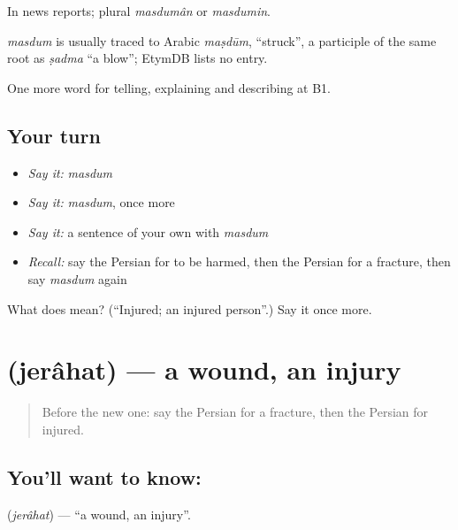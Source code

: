 In news reports; plural \emph{masdumân} or \emph{masdumin}.

\begin{cousinweb}
\emph{masdum} is usually traced to Arabic \emph{maṣdūm}, \textquotedblleft{}struck\textquotedblright{}, a participle of the same root as \emph{ṣadma} \textquotedblleft{}a blow\textquotedblright{}; EtymDB lists no entry.
\end{cousinweb}

\begin{grammarlens}[title={What you've built}]
One more word for telling, explaining and describing at B1.
\end{grammarlens}

\subsection*{Your turn}
\begin{itemize}
\raggedright
  \item \emph{Say it:} \emph{masdum}
  \item \emph{Say it:} \emph{masdum}, once more
  \item \emph{Say it:} a sentence of your own with \emph{masdum}
  \item \emph{Recall:} say the Persian for to be harmed, then the Persian for a fracture, then say \emph{masdum} again
\end{itemize}

\begin{tcolorbox}[breakable,colback=teal!4,colframe=teal!35!black,title={Before you move on}]
What does  mean? (\textquotedblleft{}Injured; an injured person\textquotedblright{}.) Say it once more.
\end{tcolorbox}
\section[\texorpdfstring{\fa{جراحت} (jerâhat)}{جراحت (jerâhat)}]{ (jerâhat) — a wound, an injury}

\label{lesson:FA-C326-jerahat}



\begin{quote}
Before the new one: say the Persian for a fracture, then the Persian for injured.
\end{quote}

\subsection*{You'll want to know: }
\textbf{} (\emph{jerâhat}) — \textquotedblleft{}a wound, an injury\textquotedblright{}.


